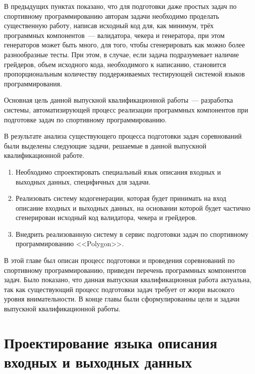 \documentclass[times,specification,annotation]{style/itmo-student-thesis/itmo-student-thesis}
\begin{document}
В предыдущих пунктах показано, что для подготовки даже простых задач по спортивному программированию авторам задачи необходимо проделать существенную работу, написав исходный код для, как минимум, трёх программных компонентов~--- валидатора, чекера и генератора, при этом генераторов может быть много, для того, чтобы сгенерировать как можно более разнообразные тесты. При этом, в случае, если задача подразумевает наличие грейдеров, объем исходного кода, необходимого к написанию, становится пропорциональным количеству поддерживаемых тестирующей системой языков программирования.


Основная цель данной выпускной квалификационной работы~--- разработка системы, автоматизирующей процесс реализации программных компонентов при подготовке задач по спортивному программированию.

В результате анализа существующего процесса подготовки задач соревнований были выделены следующие задачи, решаемые в данной выпускной квалификационной работе.

\begin{enumerate}[leftmargin=1.75cm]
    \item Необходимо спроектировать специальный язык описания входных и выходных данных, специфичных для задачи.
    \item Реализовать систему кодогенерации, которая будет принимать на вход описание входных и выходных данных, на основании которой будет частично сгенерирован исходный код валидатора, чекера и грейдеров.
    \item Внедрить реализованную систему в сервис подготовки задач по спортивному программированию <<Polygon>>.
\end{enumerate}

\chapterconclusion

В этой главе был описан процесс подготовки и проведения соревнований по спортивному программированию, приведен перечень программных компонентов задач. Было показано, что данная выпускная квалификационная работа актуальна, так как существующий процесс подготовки задач требует от жюри высокого уровня внимательности. В конце главы были сформулированны цели и задачи выпускной квалификационной работы.

\chapter{Проектирование языка описания входных и выходных данных}
\end{document}
